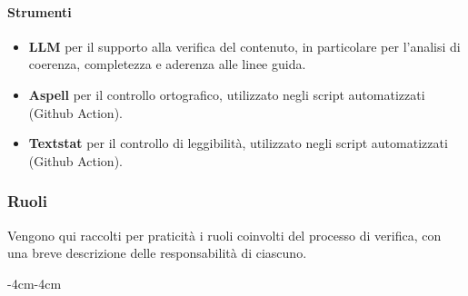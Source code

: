 \documentclass[a4paper,12pt]{article}
\begin{document}
\paragraph{Strumenti}
\begin{itemize}
    \item \textbf{LLM} per il supporto alla verifica del contenuto, in particolare per l'analisi di coerenza, completezza e aderenza alle linee guida.
    \item \textbf{Aspell} per il controllo ortografico, utilizzato negli script automatizzati (Github Action).
    \item \textbf{Textstat} per il controllo di leggibilità, utilizzato negli script automatizzati (Github Action).
\end{itemize}

\subsubsection{Ruoli}
Vengono qui raccolti per praticità i ruoli coinvolti del processo di verifica,
con una breve descrizione delle responsabilità di ciascuno.

\begin{table}[H]
    \begin{adjustwidth}{-4cm}{-4cm}
        \centering
    \end{adjustwidth}
\end{table}
\end{document}
